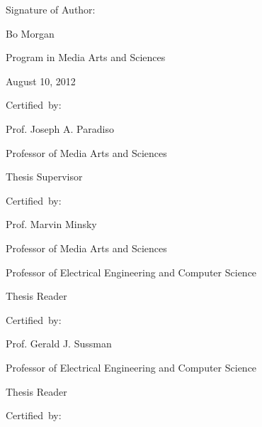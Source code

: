 \begin{addmargin}[-1cm]{-3cm}
\begin{flushright}
  Signature of Author:\hspace{0.5cm}~\makebox[2.75in]{\hrulefill}

                                 Bo Morgan

                                 Program in Media Arts and Sciences
                                 
                                 August 10, 2012
                                 
  \vspace{5mm}
  
  Certified~by:\hspace{0.5cm}~\makebox[2.75in]{\hrulefill}

                                 Prof. Joseph A. Paradiso

                                 Professor of Media Arts and Sciences
                                 
                                 Thesis Supervisor

  \vspace{5mm}
  
  Certified~by:\hspace{0.5cm}~\makebox[2.75in]{\hrulefill}
  
                                 Prof. Marvin Minsky

                                 Professor of Media Arts and Sciences

                                 Professor of Electrical Engineering and Computer Science
                                 
                                 Thesis Reader

  \vspace{5mm}

  Certified~by:\hspace{0.5cm}~\makebox[2.75in]{\hrulefill}
  
                                 Prof. Gerald J. Sussman

                                 Professor of Electrical Engineering and Computer Science
                                 
                                 Thesis Reader

  \vspace{5mm}

  Certified~by:\hspace{0.5cm}~\makebox[2.75in]{\hrulefill}


\end{flushright}
\end{addmargin}

